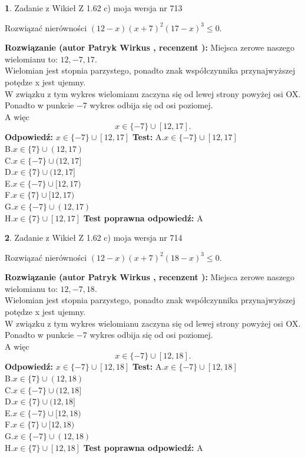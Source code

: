 \documentclass[12pt, a4paper]{article}
\theoremstyle{definition} %
\newtheorem{zad}{}
\newcommand{\zadStart}[1]{\begin{zad}#1\newline}
\newcommand{\zadStop}{\end{zad}}
\newcommand{\rozwStart}[2]{\noindent \textbf{Rozwiązanie (autor #1 , recenzent #2): }\newline}
\newcommand{\rozwStop}{\newline}
\newcommand{\odpStart}{\noindent \textbf{Odpowiedź:}\newline}
\newcommand{\odpStop}{\newline}
\newcommand{\testStart}{\noindent \textbf{Test:}\newline}
\newcommand{\testStop}{\newline}
\newcommand{\kluczStart}{\noindent \textbf{Test poprawna odpowiedź:}\newline}
\newcommand{\kluczStop}{\newline}
\begin{document}
\zadStart{Zadanie z Wikieł Z 1.62 c) moja wersja nr 713}

Rozwiązać nierówności $(12-x)(x+7)^{2}(17-x)^{3}\le0$.
\zadStop
\rozwStart{Patryk Wirkus}{}
Miejsca zerowe naszego wielomianu to: $12, -7, 17$.\\
Wielomian jest stopnia parzystego, ponadto znak współczynnika przy\linebreak najwyższej potędze x jest ujemny.\\ W związku z tym wykres wielomianu zaczyna się od lewej strony powyżej osi OX.\\
Ponadto w punkcie $-7$ wykres odbija się od osi poziomej.\\
A więc $$x \in \{-7\} \cup [12,17].$$
\rozwStop
\odpStart
$x \in \{-7\} \cup [12,17]$
\odpStop
\testStart
A.$x \in \{-7\} \cup [12,17]$\\
B.$x \in \{7\} \cup (12,17)$\\
C.$x \in \{-7\} \cup (12,17]$\\
D.$x \in \{7\} \cup (12,17]$\\
E.$x \in \{-7\} \cup [12,17)$\\
F.$x \in \{7\} \cup [12,17)$\\
G.$x \in \{-7\} \cup (12,17)$\\
H.$x \in \{7\} \cup [12,17]$
\testStop
\kluczStart
A
\kluczStop



\zadStart{Zadanie z Wikieł Z 1.62 c) moja wersja nr 714}

Rozwiązać nierówności $(12-x)(x+7)^{2}(18-x)^{3}\le0$.
\zadStop
\rozwStart{Patryk Wirkus}{}
Miejsca zerowe naszego wielomianu to: $12, -7, 18$.\\
Wielomian jest stopnia parzystego, ponadto znak współczynnika przy\linebreak najwyższej potędze x jest ujemny.\\ W związku z tym wykres wielomianu zaczyna się od lewej strony powyżej osi OX.\\
Ponadto w punkcie $-7$ wykres odbija się od osi poziomej.\\
A więc $$x \in \{-7\} \cup [12,18].$$
\rozwStop
\odpStart
$x \in \{-7\} \cup [12,18]$
\odpStop
\testStart
A.$x \in \{-7\} \cup [12,18]$\\
B.$x \in \{7\} \cup (12,18)$\\
C.$x \in \{-7\} \cup (12,18]$\\
D.$x \in \{7\} \cup (12,18]$\\
E.$x \in \{-7\} \cup [12,18)$\\
F.$x \in \{7\} \cup [12,18)$\\
G.$x \in \{-7\} \cup (12,18)$\\
H.$x \in \{7\} \cup [12,18]$
\testStop
\kluczStart
A
\kluczStop
\end{document}

